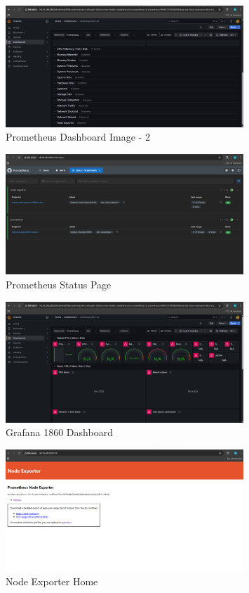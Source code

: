 \begin{figure}[htbp]
    \centering
    \includegraphics[width=0.8\textwidth]{png/PrometheusAndGrafana/prometheus-dashboard-2.png}
    \caption{Prometheus Dashboard Image - 2}
    \label{fig:prometheusDashboard-2}
\end{figure}

\begin{figure}[htbp]
    \centering
    \includegraphics[width=0.8\textwidth]{png/PrometheusAndGrafana/prometheus-status.png}
    \caption{Prometheus Status Page}
    \label{fig:prometheusStatus}
\end{figure}

\begin{figure}[htbp]
    \centering
    \includegraphics[width=0.8\textwidth]{png/PrometheusAndGrafana/grafana-dashboard.png}
    \caption{Grafana 1860 Dashboard}
    \label{fig:grafanaDashboard}
\end{figure}

\begin{figure}[htbp]
    \centering
    \includegraphics[width=0.8\textwidth]{png/PrometheusAndGrafana/node-exporter-home.png}
    \caption{Node Exporter Home}
    \label{fig:nodeExporterHome}
\end{figure}

